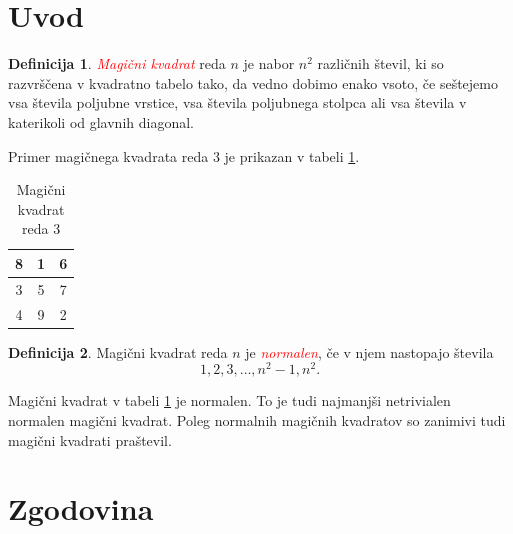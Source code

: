 \documentclass[a4paper,12pt]{article}
\theoremstyle{definition}
\newtheorem{definition}{Definicija}
\begin{document}
\section{Uvod}

\begin{definition}
   \textcolor{red}{\emph{Magični kvadrat}} reda $n$ je nabor $n^2$ različnih števil,
   ki so razvrščena v kvadratno tabelo tako, da vedno dobimo enako vsoto,
   če seštejemo vsa števila poljubne vrstice, vsa števila poljubnega
   stolpca ali vsa števila v katerikoli od glavnih diagonal.
\end{definition}

Primer magičnega kvadrata reda 3 je prikazan v tabeli \ref{table:mg3}.

\begin{table}[h!]
   \centering
   \caption{Magični kvadrat reda 3}
   \label{table:mg3}
   \begin{tabular}{|c|c|c|}
      \hline
      8 & 1 & 6 \\\hline
      3 & 5 & 7 \\\hline
      4 & 9 & 2 \\\hline
      \end{tabular}

\end{table}

\begin{definition}
   Magični kvadrat reda $n$ je \textcolor{red}{\emph{normalen}}, če v njem nastopajo števila
   \begin{equation}
      \label{eq:numbers}
      1, 2, 3, \ldots, n^2-1, n^2.
   \end{equation}
\end{definition}

Magični kvadrat v tabeli \ref{table:mg3} je normalen.
To je tudi najmanjši netrivialen normalen magični kvadrat.
Poleg normalnih magičnih kvadratov so zanimivi tudi magični kvadrati praštevil.


\section{Zgodovina}
\end{document}
